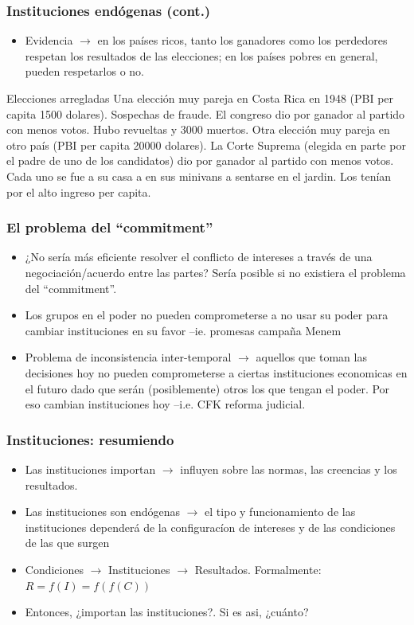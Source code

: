 \documentclass[handout,final,xcolor=dvipsnames]{beamer}
\begin{document}
\begin{frame}\frametitle{Instituciones endógenas (cont.)}
\begin{itemize}\itemsep 15pt
\item Evidencia $\longrightarrow$ en los países ricos, tanto los
  ganadores como los perdedores respetan los resultados de las
  elecciones; en los países pobres en general, pueden respetarlos o
  no.
  \end{itemize}
  \begin{block}{Elecciones arregladas}
    Una elección muy pareja en Costa Rica en 1948 (PBI per capita 1500
    dolares). Sospechas de fraude. El congreso dio por ganador al
    partido con menos votos. Hubo revueltas y 3000 muertos. Otra
    elección muy pareja en otro país (PBI per capita 20000
    dolares). La Corte Suprema (elegida en parte por el padre de uno
    de los candidatos) dio por ganador al partido con menos
    votos. Cada uno se fue a su casa a en sus minivans a sentarse en
    el jardin. Los tenían por el alto ingreso per capita. 
  \end{block}
 \end{frame}


\begin{frame}\frametitle{El problema del ``commitment''}
\begin{itemize}\itemsep 15pt
\item ¿No sería más eficiente resolver el conflicto de intereses a
  través de una negociación/acuerdo entre las partes? Sería posible si
  no existiera el problema del ``commitment''. 
\item Los grupos en el poder no pueden comprometerse a no usar su
  poder para cambiar instituciones en su favor --ie. promesas campaña Menem
\item Problema de inconsistencia inter-temporal $\longrightarrow$
  aquellos que toman las decisiones hoy no pueden comprometerse a
  ciertas instituciones economicas en el futuro dado que serán
  (posiblemente) otros los que tengan el poder. Por eso cambian
  instituciones hoy --i.e. CFK reforma judicial. 
\end{itemize}
\end{frame}





\begin{frame}\frametitle{Instituciones: resumiendo}
\begin{itemize}\itemsep 15pt
\item Las instituciones importan $\longrightarrow$ influyen sobre las
  normas, las creencias y los resultados. 
\item Las instituciones son endógenas $\longrightarrow$ el tipo y
  funcionamiento de las 
  instituciones dependerá de la configuracíon de intereses y de las
  condiciones de las que surgen
\item Condiciones $\longrightarrow$ Instituciones $\longrightarrow$
  Resultados. Formalmente: $R=f(I)=f(f(C))$
\item Entonces, ¿importan las instituciones?. Si es asi, ¿cuánto?
\end{itemize} 
\end{frame}
\end{document}
